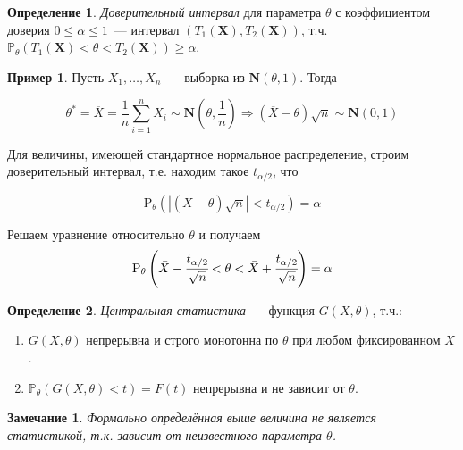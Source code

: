 \documentclass[oneside,final,14pt]{extreport}
\newtheorem*{rmrk}{Замечание}
\theoremstyle{definition}
\newtheorem{defn}{Определение}[section]
\newtheorem*{exmp}{Пример}
\begin{document}
\begin{defn}
{\it Доверительный интервал} для параметра $\theta$ с коэффициентом доверия $0 \leq \alpha \leq 1$~--- интервал $(T_1(\mathbf{X}), T_2(\mathbf{X}))$, т.ч. $\mathbb{P}_{\theta}(T_1(\mathbf{X}) < \theta < T_2(\mathbf{X})) \geq \alpha$.
\end{defn}

\begin{exmp}
Пусть $X_1, \ldots, X_n$~--- выборка из $\mathbf{N}(\theta, 1)$. Тогда

\begin{equation*}
    \theta^{*}
    = \overline{X}
    = \frac{1}{n} \sum_{i=1}^{n} X_{i} \sim \mathbf{N}\left(\theta, \frac{1}{n}\right)
    \Rightarrow (\overline{X}-\theta) \sqrt{n} \sim \mathbf{N}(0,1)
\end{equation*}

Для величины, имеющей стандартное нормальное распределение, строим доверительный интервал, т.е. находим такое $t_{\alpha / 2}$, что 

\begin{equation*}
    \mathrm{P}_{\theta}\left(|(\bar{X}-\theta) \sqrt{n}|<t_{\alpha / 2}\right)=\alpha
\end{equation*}

Решаем уравнение относительно $\theta$ и получаем
\begin{equation*}
    \mathrm{P}_{\theta}\left(\bar{X}-\cfrac{t_{\alpha / 2}}{\sqrt{n}}<\theta<\bar{X}+\cfrac{t_{\alpha / 2}}{\sqrt{n}}\right)=\alpha 
\end{equation*}

\end{exmp}

\begin{defn}
{\it Центральная статистика}~--- функция $G(X,\theta)$, т.ч.:
\begin{enumerate}
    \item $G(X,\theta)$ непрерывна и строго монотонна по $\theta$ при любом фиксированном $X$.
    \item $\mathbb{P}_{\theta}(G(X, \theta)<t)=F(t)$ непрерывна и не зависит от $\theta$.
\end{enumerate}
\end{defn}

\begin{rmrk}
Формально определённая выше величина не является статистикой, т.к. зависит от неизвестного параметра $\theta$.
\end{rmrk}
\end{document}
